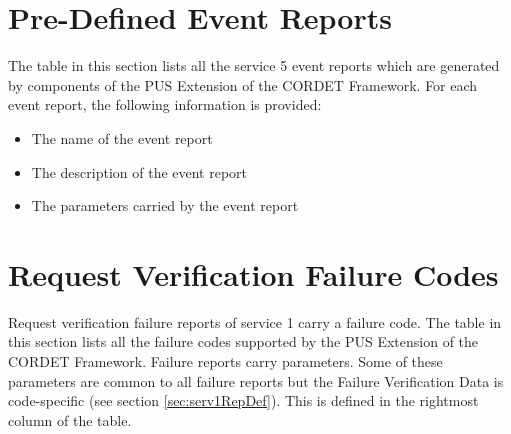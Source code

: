 \documentclass{pnp_article}
\begin{document}
\newpage
\appendix
\section{Pre-Defined Event Reports}\label{sec:preDefEvtRep}
The table in this section lists all the service 5 event reports which are generated by components of the PUS Extension of the CORDET Framework. For each event report, the following information is provided:

\begin{itemize}
\item The name of the event report
\item The description of the event report
\item The parameters carried by the event report
\end{itemize}

\begin{landscape} 


\end{landscape}


\section{Request Verification Failure Codes}\label{sec:reqVerFailCodes}
Request verification failure reports of service 1 carry a failure code. The table in this section lists all the failure codes supported by the PUS Extension of the CORDET Framework. Failure reports carry parameters. Some of these parameters are common to all failure reports but the Failure Verification Data is code-specific (see section \ref{sec:serv1RepDef}). This is defined in the rightmost column of the table.

\begin{landscape}


\end{landscape}
\end{document}
